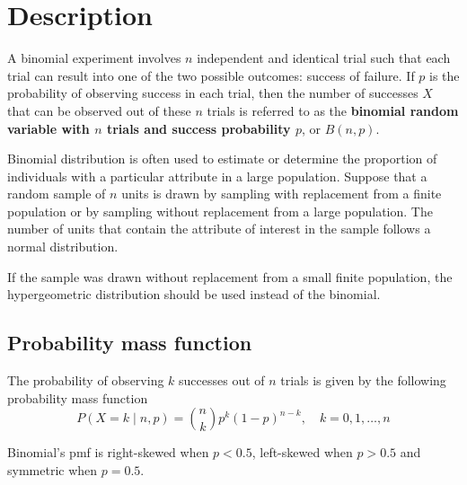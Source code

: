 \section{Description}

A binomial experiment involves $n$ independent and identical trial such that each trial can result into one of the two possible outcomes: success of failure. If $p$ is the probability of observing success in each trial, then the number of successes $X$ that can be observed out of these $n$ trials is referred to as the \textbf{binomial random variable with $n$ trials and success probability $p$}, or $B(n, p)$.

Binomial distribution is often used to estimate or determine the proportion of individuals with a particular attribute in a large population. Suppose that a random sample of $n$ units is drawn by sampling with replacement from a finite population or by sampling without replacement from a large population. The number of units that contain the attribute of interest in the sample follows a normal distribution.

If the sample was drawn without replacement from a small finite population, the hypergeometric distribution should be used instead of the binomial.

\subsection{Probability mass function}
The probability of observing $k$ successes out of $n$ trials is given by the following probability mass function
\[
	P(X = k \mid n, p) = \binom{n}{k}p^{k}(1 - p)^{n - k}, \quad k = 0, 1, \ldots, n
\]

Binomial's pmf is right-skewed when $p < 0.5$, left-skewed when $p > 0.5$ and symmetric when $p = 0.5$.

